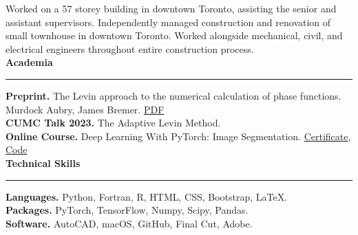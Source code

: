 \documentclass{article}
\begin{document}
\begin{spacing}{1.2}
Worked on a 57 storey building in downtown Toronto, assisting the senior and assistant supervisors.
Independently managed construction and renovation of small townhouse in downtown Toronto.
Worked alongside mechanical, civil, and electrical engineers throughout entire construction process.\\[0.20cm]


\LARGE{\textbf{Academia}}\normalsize\\
\vspace{-0.2cm}
\noindent\rule{17cm}{0.7pt}

\textbf{Preprint.} The Levin approach to the numerical calculation of phase functions. Murdock Aubry, James Bremer.
\href{https://arxiv.org/pdf/2308.03288.pdf}{\color{blue}PDF}\\[0.10cm]

\textbf{CUMC Talk 2023.} The Adaptive Levin Method. \\[0.10cm]

\textbf{Online Course.} Deep Learning With PyTorch: Image Segmentation.
\href{https://coursera.org/share/af13e96fd8a6f4c130db6e4bed3a3f1e}{\color{blue}Certificate},
\href{https://colab.research.google.com/drive/10UfARsUTKQkb56pkxxvbH-zTucQkDJEw#scrollTo=seventh-seating}{\color{blue}Code}\\[0.20cm]

\LARGE{\textbf{Technical Skills}}\normalsize \\[0.10cm]
\vspace{-0.2cm}
\noindent\rule{17cm}{0.7pt}

\textbf{Languages.} Python, Fortran, R, HTML, CSS, Bootstrap, \LaTeX .\\[0.10cm]

\textbf{Packages.} PyTorch, TensorFlow, Numpy, Scipy, Pandas. \\[0.10cm]

\textbf{Software.} AutoCAD, macOS, GitHub, Final Cut, Adobe. \\[0.10cm]

\end{spacing}
\end{document}
